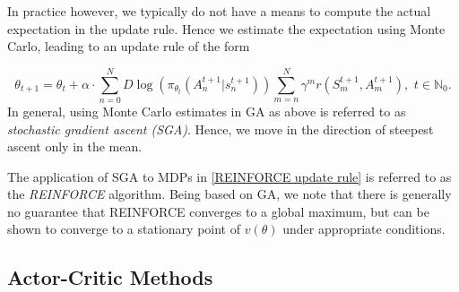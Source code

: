 In practice however, we typically do not have a means to compute the actual expectation in the update rule. Hence we estimate the expectation using Monte Carlo, leading to an update rule of the form

\begin{equation}\label{REINFORCE update rule}\tag{\textasteriskcentered}
     \theta_{t+1} = \theta_t + \alpha \cdot \sum_{ n = 0}^N D \log(\pi_{\theta_t}(A_n^{t+1} | s_n^{t+1})) \sum_{m=n}^N \gamma^m r(S_m^{t+1}, A_m^{t+1}), \,\, t \in \mathbb{N}_{0}.
\end{equation}
In general, using Monte Carlo estimates in GA as above is referred to as
\emph{stochastic gradient ascent (SGA)}. Hence, we move in the direction of steepest ascent only in the mean.

The application of SGA to MDPs in \eqref{REINFORCE update rule} is referred to as the \emph{REINFORCE} algorithm.
Being based on GA, we note that there is generally no guarantee that REINFORCE converges to a global maximum, but can be shown to converge to a stationary point of \( v(\theta) \) under appropriate conditions. 














\subsection{Actor-Critic Methods}

